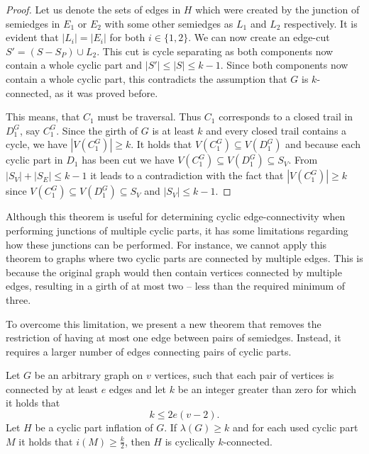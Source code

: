 \documentclass[12pt, twoside]{book}
\begin{document}
\begin{proof}
	Let us denote the sets of edges in $H$ which were created by the junction of semiedges in $E_1$ or $E_2$ with some other semiedges as $L_1$ and $L_2$ respectively. It is evident that $|L_i|=|E_i|$ for both $i\in\{1,2\}$. We can now create an edge-cut $S'=(S-S_P)\cup L_2$. This cut is cycle separating as both components now contain a whole cyclic part and $|S'|\leq |S|\leq k-1$. Since both components now contain a whole cyclic part, this contradicts the assumption that $G$ is $k$-connected, as it was proved before.
	
	This means, that $C_1$ must be traversal. Thus $C_1$ corresponds to a closed trail in $D_1^G$, say $C_1^G$. Since the girth of $G$ is at least $k$ and every closed trail contains a cycle, we have $|V(C_1^G)|\geq k$. It holds that $V(C_1^G)\subseteq V(D_1^G)$ and because each cyclic part in $D_1$ has been cut we have $V(C_1^G)\subseteq V(D_1^G)\subseteq S_V$. From $|S_V|+|S_E|\leq k-1$ it leads to a contradiction with the fact that $|V(C_1^G)|\geq k$ since $V(C_1^G)\subseteq V(D_1^G)\subseteq S_V$ and $|S_V|\leq k-1$.
\end{proof}

Although this theorem is useful for determining cyclic edge-connectivity when performing junctions of multiple cyclic parts, it has some limitations regarding how these junctions can be performed. For instance, we cannot apply this theorem to graphs where two cyclic parts are connected by multiple edges. This is because the original graph would then contain vertices connected by multiple edges, resulting in a girth of at most two -- less than the required minimum of three.

To overcome this limitation, we present a new theorem that removes the restriction of having at most one edge between pairs of semiedges. Instead, it requires a larger number of edges connecting pairs of cyclic parts.

\begin{theorem}\label{th:cyclic-part-inflation-kve}
	Let $G$ be an arbitrary graph on $v$ vertices, such that each pair of vertices is connected by at least $e$ edges and let $k$ be an integer greater than zero for which it holds that
	$$k\leq 2e(v-2).$$
	Let $H$ be a cyclic part inflation of $G$. If $\lambda(G)\geq k$ and for each used cyclic part $M$ it holds that $i(M)\geq \frac{k}{2}$, then $H$ is cyclically $k$-connected.
\end{theorem}
\end{document}
